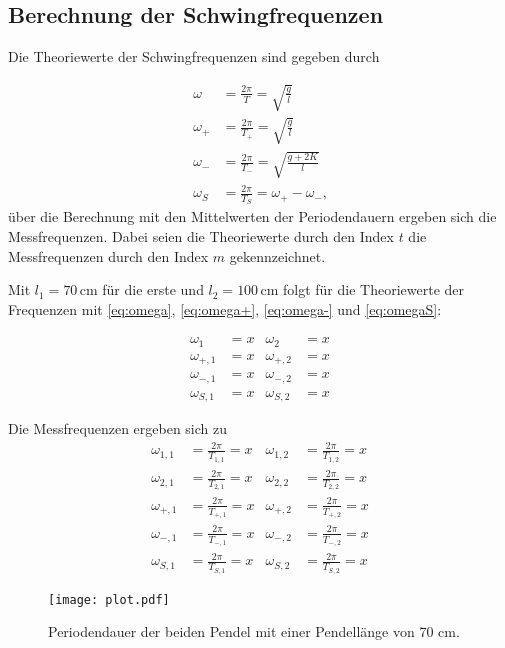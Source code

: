 \newpage

\subsection{Berechnung der Schwingfrequenzen}

Die Theoriewerte der Schwingfrequenzen sind gegeben durch

\begin{align}
  \omega   & = \frac{2π}{T}     =   \sqrt{\frac{g}{l}} \label{eq:omega} \\
  \omega_+ & = \frac{2π}{T_+} =   \sqrt{\frac{g}{l}} \label{eq:omega+} \\
  \omega_- & = \frac{2π}{T_-} =\sqrt{\frac{g+2K}{l}} \label{eq:omega-} \\
  \omega_S & = \frac{2π}{T_S} =  \omega_+ -\omega_- \label{eq:omegaS} \text{,}
\end{align}
über die Berechnung mit den Mittelwerten der Periodendauern ergeben sich die Messfrequenzen. Dabei seien die Theoriewerte durch den Index $t$
die Messfrequenzen durch den Index $m$ gekennzeichnet.

Mit $l_1=70 \, \unit{\centi\meter}$ für die erste und $l_2= 100 \, \unit{\centi\meter}$ folgt für die Theoriewerte der Frequenzen mit \eqref{eq:omega}, \eqref{eq:omega+}, \eqref{eq:omega-} und \eqref{eq:omegaS}:

\begin{align}
\omega_1 & = x & \omega_2 & = x \nonumber\\
\omega_{+,1} & = x & \omega_{+,2} & = x \nonumber\\
\omega_{-,1} & = x & \omega_{-,2} & = x \nonumber\\
\omega_{S,1} & = x & \omega_{S,2} & = x \nonumber
\end{align}

Die Messfrequenzen ergeben sich zu
\begin{align}
\omega_{1,1} & = \frac{2π}{T_{1,1}}   = x & \omega_{1,2} & =  \frac{2π}{T_{1,2}}   = x \nonumber \\
\omega_{2,1} & = \frac{2π}{T_{2,1}}  = x & \omega_{2,2} & =  \frac{2π}{T_{2,2}}  = x \nonumber \\
\omega_{+,1} & = \frac{2π}{T_{+,1}}  = x & \omega_{+,2} & =  \frac{2π}{T_{+,2}}  = x \nonumber \\
\omega_{-,1} & = \frac{2π}{T_{-,1}}  = x & \omega_{-,2} & =  \frac{2π}{T_{-,2}}  = x \nonumber \\
\omega_{S,1} & = \frac{2π}{T_{S,1}} = x & \omega_{S,2} & =   \frac{2π}{T_{S,2}}     = x \nonumber
\end{align} 



\begin{figure}
  \centering
  \texttt{[image: plot.pdf]}
  \caption{Periodendauer der beiden Pendel mit einer Pendellänge von 70 cm.}
  \label{fig:plot}
\end{figure}


